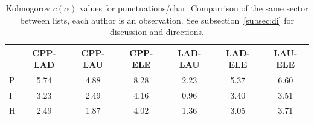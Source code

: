 \documentclass[%
 aip,
 jmp,%
 amsmath,amssymb,
 reprint,%
 floatfix,
]{revtex4-1}
\begin{document}
\begin{table}
  \centering
    \small
\setlength{\tabcolsep}{.06667em}
  \begin{tabular}{|l|| c|c|c|c|c|c|}\hline
 & CPP-LAD & CPP-LAU & CPP-ELE & LAD-LAU & LAD-ELE & LAU-ELE \\\hline
P & 5.74 & 4.88 & 8.28 & 2.23 & 5.37 & 6.60 \\\hline
I & 3.23 & 2.49 & 4.16 & 0.96 & 3.40 & 3.51 \\\hline
H & 2.49 & 1.87 & 4.02 & 1.36 & 3.05 & 3.71 \\\hline
  \end{tabular}
  \caption{Kolmogorov $c(\alpha)$ values for punctuations/char. Comparrison of the same sector between lists, each author is an observation. See subsection~\ref{subsec:di} for discussion and directions.}
  \label{tab:kolPctInter}
\end{table}
\end{document}
